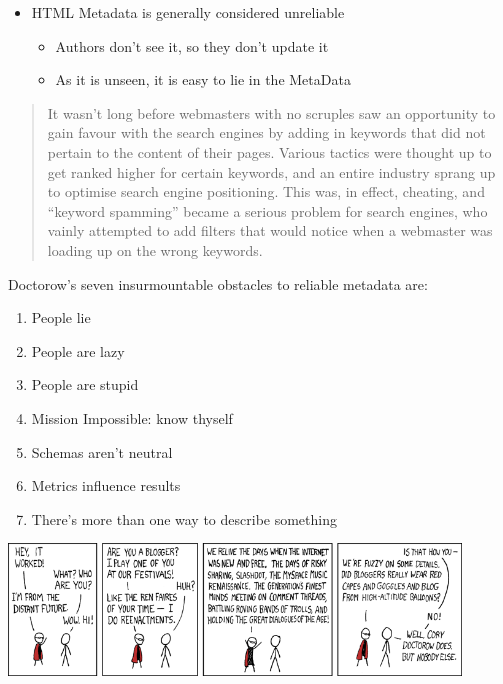 \documentclass[a4paper,landscape,headrule,footrule,xetex]{foils}
\begin{document}
\begin{itemize}
\item HTML Metadata is generally considered unreliable
  \begin{itemize}
  \item Authors don't see it, so they don't update it
  \item As it is unseen, it is easy to lie in the MetaData
  \end{itemize}
\end{itemize}
\begin{quotation} 
  It wasn't long before webmasters with no scruples saw an opportunity to gain favour with the search engines by adding in keywords that did not pertain to the content of their pages. Various tactics were thought up to get ranked higher for certain keywords, and an entire industry sprang up to optimise search engine positioning. This was, in effect, cheating, and ``keyword spamming'' became a serious problem for search engines, who vainly attempted to add filters that would notice when a webmaster was loading up on the wrong keywords.
\end{quotation}



Doctorow's seven insurmountable obstacles to reliable metadata are:
\begin{enumerate}
\item  People lie
\item  People are lazy
\item  People are stupid
\item  Mission Impossible: know thyself
\item  Schemas aren't neutral
\item  Metrics influence results
\item  There's more than one way to describe something
\end{enumerate}



\includegraphics[width=0.9\textwidth]{../pics/blagofaire.png}
\end{document}
